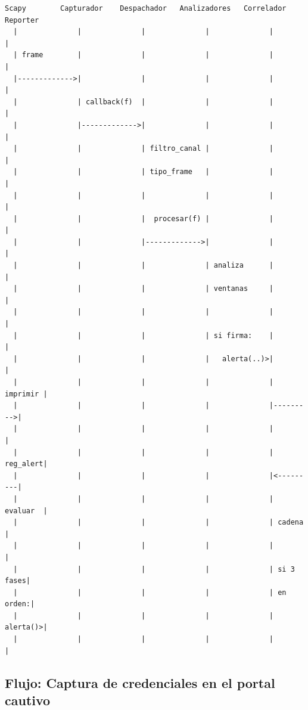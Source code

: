 \documentclass[11pt,a4paper]{article}
\begin{document}
\vspace{0.3cm}
\begin{verbatim}
Scapy        Capturador    Despachador   Analizadores   Correlador   Reporter
  |              |              |              |              |          |
  | frame        |              |              |              |          |
  |------------->|              |              |              |          |
  |              | callback(f)  |              |              |          |
  |              |------------->|              |              |          |
  |              |              | filtro_canal |              |          |
  |              |              | tipo_frame   |              |          |
  |              |              |              |              |          |
  |              |              |  procesar(f) |              |          |
  |              |              |------------->|              |          |
  |              |              |              | analiza      |          |
  |              |              |              | ventanas     |          |
  |              |              |              |              |          |
  |              |              |              | si firma:    |          |
  |              |              |              |   alerta(..)>|          |
  |              |              |              |              | imprimir |
  |              |              |              |              |--------->|
  |              |              |              |              |          |
  |              |              |              |              | reg_alert|
  |              |              |              |              |<---------|
  |              |              |              |              | evaluar  |
  |              |              |              |              | cadena   |
  |              |              |              |              |          |
  |              |              |              |              | si 3 fases|
  |              |              |              |              | en orden:|
  |              |              |              |              | alerta()>|
  |              |              |              |              |          |
\end{verbatim}

\subsection{Flujo: Captura de credenciales en el portal cautivo}
\end{document}
